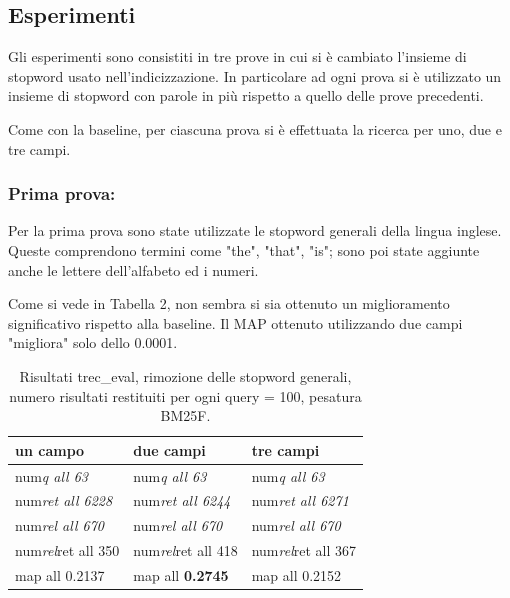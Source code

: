 \documentclass[runningheads]{llncs}
\begin{document}

\subsection{Esperimenti}

Gli esperimenti sono consistiti in tre prove in cui si \`e cambiato l'insieme di stopword usato nell'indicizzazione. In particolare ad ogni prova si \`e utilizzato un insieme di stopword con parole in pi\`u rispetto a quello delle prove precedenti.

Come con la baseline, per ciascuna prova si \`e effettuata la ricerca per uno, due e tre campi.

\subsubsection{Prima prova:}

Per la prima prova sono state utilizzate le stopword generali della lingua inglese. Queste comprendono termini come "the", "that", "is"; sono poi state aggiunte anche le lettere dell'alfabeto ed i numeri.

Come si vede in Tabella 2, non sembra si sia ottenuto un miglioramento significativo rispetto alla baseline. Il MAP ottenuto utilizzando due campi "migliora" solo dello 0.0001.
\begin{table}
\centering
\begin{tabular}{lll}
\hline
\textbf{ un campo }           & \textbf{ due campi }           & \textbf{ tre campi }            \\ \hline
 num\textit{q all 63 }       &  num\textit{q all 63 }       &  num\textit{q all 63 }        \\
 num\textit{ret all 6228 }  &  num\textit{ret all 6244 }  &  num\textit{ret all 6271 }   \\
 num\textit{rel all 670 }    &  num\textit{rel all 670 }    &  num\textit{rel all 670 }     \\
 num\textit{rel}ret all 350  &  num\textit{rel}ret all 418  &  num\textit{rel}ret all 367   \\
map all 0.2137               & map all \bf 0.2745               & map all 0.2152          \\ \hline
\end{tabular}

\caption{ Risultati trec\_eval, rimozione delle stopword generali, numero risultati restituiti per ogni query = 100, pesatura BM25F.}
\end{table}
\end{document}
